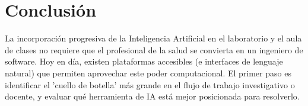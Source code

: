 \documentclass[12pt,letterpaper]{article}
\begin{document}
\section{Conclusión}
La incorporación progresiva de la Inteligencia Artificial en el laboratorio y el aula de clases no requiere que el profesional de la salud se convierta en un ingeniero de software. Hoy en día, existen plataformas accesibles (e interfaces de lenguaje natural) que permiten aprovechar este poder computacional. El primer paso es identificar el 'cuello de botella' más grande en el flujo de trabajo investigativo o docente, y evaluar qué herramienta de IA está mejor posicionada para resolverlo.
\end{document}
